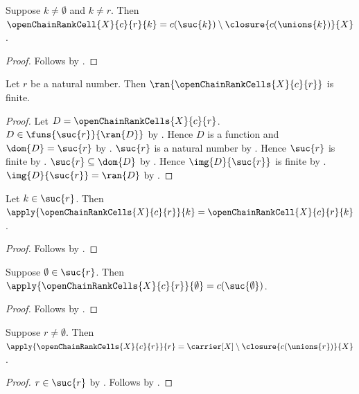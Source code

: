 \begin{proposition}\label{open_chain_rank_cell_interior}
    Suppose $k\neq\emptyset$ and $k\neq r$.
    Then
        $\openChainRankCell{X}{c}{r}{k}
            =c(\suc{k})\setminus\closure{c(\unions{k})}{X}$.
\end{proposition}
\begin{proof}
    Follows by
        .
\end{proof}

\begin{corollary}\label{open_chain_rank_cells_range_finite}
    Let $r$ be a natural number.
    Then $\ran{\openChainRankCells{X}{c}{r}}$ is finite.
\end{corollary}
\begin{proof}
    Let $D=\openChainRankCells{X}{c}{r}$.
    $D\in\funs{\suc{r}}{\ran{D}}$
        by .
    Hence $D$ is a function and $\dom{D}=\suc{r}$
        by .
    $\suc{r}$ is a natural number by .
    Hence $\suc{r}$ is finite by .
    $\suc{r}\subseteq\dom{D}$ by .
    Hence $\img{D}{\suc{r}}$ is finite
        by .
    $\img{D}{\suc{r}}=\ran{D}$ by .
\end{proof}

\begin{proposition}\label{open_chain_rank_cells_apply}
    Let $k\in\suc{r}$.
    Then $\apply{\openChainRankCells{X}{c}{r}}{k}
        =\openChainRankCell{X}{c}{r}{k}$.
\end{proposition}
\begin{proof}
    Follows by
        .
\end{proof}

\begin{corollary}\label{open_chain_rank_cells_zero}
    Suppose $\emptyset\in\suc{r}$.
    Then $\apply{\openChainRankCells{X}{c}{r}}{\emptyset}
        =c(\suc{\emptyset})$.
\end{corollary}
\begin{proof}
    Follows by
        .
\end{proof}

\begin{corollary}\label{open_chain_rank_cells_last}
    Suppose $r\neq\emptyset$.
    Then $\apply{\openChainRankCells{X}{c}{r}}{r}
        =\carrier[X]\setminus\closure{c(\unions{r})}{X}$.
\end{corollary}
\begin{proof}
    $r\in\suc{r}$ by .
    Follows by
        .
\end{proof}

